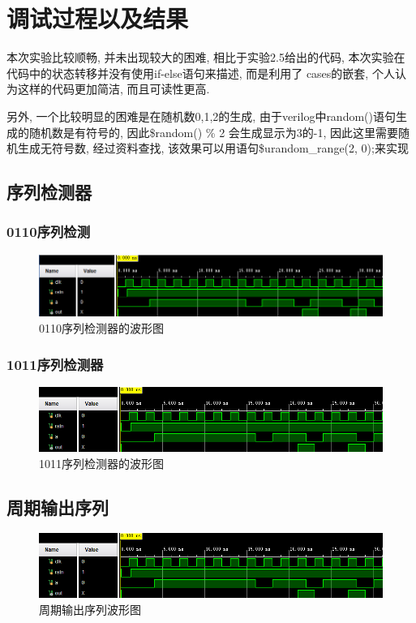 \documentclass[fontset=windows,12pt]{article}
\begin{document}
\section{调试过程以及结果}
    本次实验比较顺畅, 并未出现较大的困难, 相比于实验2.5给出的代码, 本次实验在代码中的状态转移并没有使用if-else语句来描述, 而是利用了
    cases的嵌套, 个人认为这样的代码更加简洁, 而且可读性更高.\par
    另外, 一个比较明显的困难是在随机数0,1,2的生成, 由于verilog中random()语句生成的随机数是有符号的, 因此\$random() \% 2 会生成显示为3的-1,
    因此这里需要随机生成无符号数, 经过资料查找, 该效果可以用语句\$urandom\_range(2, 0);来实现
    \subsection{序列检测器}
        \subsubsection{0110序列检测}
        \begin{figure}[ht]
            \centering
            \includegraphics[width=1\textwidth]{波形图1.jpg}
            \caption{0110序列检测器的波形图}
        \end{figure}
        \subsubsection{1011序列检测器}
        \begin{figure}[ht]
            \centering
            \includegraphics[width=1\textwidth]{波形图2.jpg}
            \caption{1011序列检测器的波形图}
        \end{figure}
        \subsection{周期输出序列}
        \begin{figure}[ht]
            \centering
            \includegraphics[width=1\textwidth]{波形图2.jpg}
            \caption{周期输出序列波形图}
        \end{figure}
        \bigskip\bigskip\bigskip\bigskip\bigskip\bigskip\bigskip\bigskip\bigskip\bigskip\bigskip\bigskip\bigskip\bigskip
\end{document}
